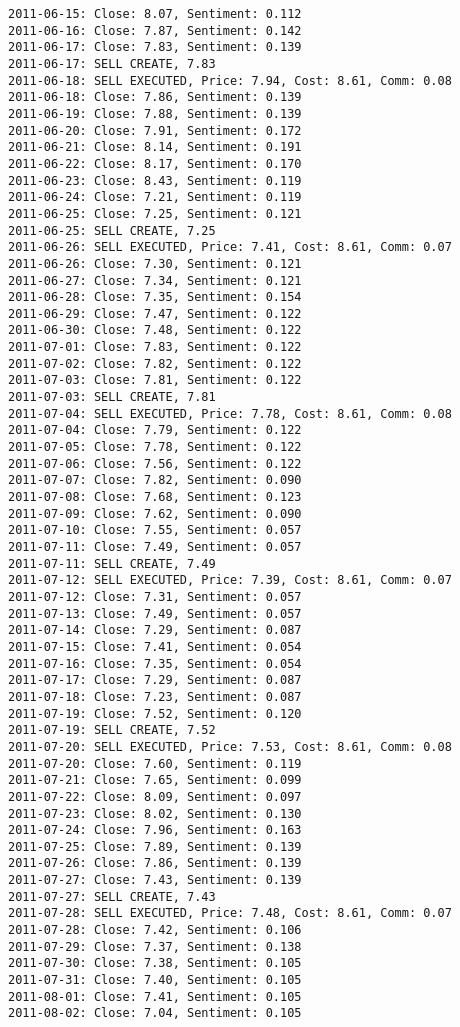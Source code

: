 \documentclass[11pt]{article}
\begin{document}
\begin{Verbatim}[commandchars=\\\{\}]
2011-06-15: Close: 8.07, Sentiment: 0.112
2011-06-16: Close: 7.87, Sentiment: 0.142
2011-06-17: Close: 7.83, Sentiment: 0.139
2011-06-17: SELL CREATE, 7.83
2011-06-18: SELL EXECUTED, Price: 7.94, Cost: 8.61, Comm: 0.08
2011-06-18: Close: 7.86, Sentiment: 0.139
2011-06-19: Close: 7.88, Sentiment: 0.139
2011-06-20: Close: 7.91, Sentiment: 0.172
2011-06-21: Close: 8.14, Sentiment: 0.191
2011-06-22: Close: 8.17, Sentiment: 0.170
2011-06-23: Close: 8.43, Sentiment: 0.119
2011-06-24: Close: 7.21, Sentiment: 0.119
2011-06-25: Close: 7.25, Sentiment: 0.121
2011-06-25: SELL CREATE, 7.25
2011-06-26: SELL EXECUTED, Price: 7.41, Cost: 8.61, Comm: 0.07
2011-06-26: Close: 7.30, Sentiment: 0.121
2011-06-27: Close: 7.34, Sentiment: 0.121
2011-06-28: Close: 7.35, Sentiment: 0.154
2011-06-29: Close: 7.47, Sentiment: 0.122
2011-06-30: Close: 7.48, Sentiment: 0.122
2011-07-01: Close: 7.83, Sentiment: 0.122
2011-07-02: Close: 7.82, Sentiment: 0.122
2011-07-03: Close: 7.81, Sentiment: 0.122
2011-07-03: SELL CREATE, 7.81
2011-07-04: SELL EXECUTED, Price: 7.78, Cost: 8.61, Comm: 0.08
2011-07-04: Close: 7.79, Sentiment: 0.122
2011-07-05: Close: 7.78, Sentiment: 0.122
2011-07-06: Close: 7.56, Sentiment: 0.122
2011-07-07: Close: 7.82, Sentiment: 0.090
2011-07-08: Close: 7.68, Sentiment: 0.123
2011-07-09: Close: 7.62, Sentiment: 0.090
2011-07-10: Close: 7.55, Sentiment: 0.057
2011-07-11: Close: 7.49, Sentiment: 0.057
2011-07-11: SELL CREATE, 7.49
2011-07-12: SELL EXECUTED, Price: 7.39, Cost: 8.61, Comm: 0.07
2011-07-12: Close: 7.31, Sentiment: 0.057
2011-07-13: Close: 7.49, Sentiment: 0.057
2011-07-14: Close: 7.29, Sentiment: 0.087
2011-07-15: Close: 7.41, Sentiment: 0.054
2011-07-16: Close: 7.35, Sentiment: 0.054
2011-07-17: Close: 7.29, Sentiment: 0.087
2011-07-18: Close: 7.23, Sentiment: 0.087
2011-07-19: Close: 7.52, Sentiment: 0.120
2011-07-19: SELL CREATE, 7.52
2011-07-20: SELL EXECUTED, Price: 7.53, Cost: 8.61, Comm: 0.08
2011-07-20: Close: 7.60, Sentiment: 0.119
2011-07-21: Close: 7.65, Sentiment: 0.099
2011-07-22: Close: 8.09, Sentiment: 0.097
2011-07-23: Close: 8.02, Sentiment: 0.130
2011-07-24: Close: 7.96, Sentiment: 0.163
2011-07-25: Close: 7.89, Sentiment: 0.139
2011-07-26: Close: 7.86, Sentiment: 0.139
2011-07-27: Close: 7.43, Sentiment: 0.139
2011-07-27: SELL CREATE, 7.43
2011-07-28: SELL EXECUTED, Price: 7.48, Cost: 8.61, Comm: 0.07
2011-07-28: Close: 7.42, Sentiment: 0.106
2011-07-29: Close: 7.37, Sentiment: 0.138
2011-07-30: Close: 7.38, Sentiment: 0.105
2011-07-31: Close: 7.40, Sentiment: 0.105
2011-08-01: Close: 7.41, Sentiment: 0.105
2011-08-02: Close: 7.04, Sentiment: 0.105

\end{Verbatim}
\end{document}
